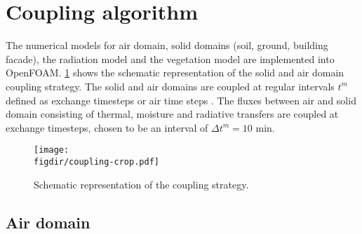 
\section{Coupling algorithm}
\label{sec:couplingalgorithm}

The numerical models for air domain, solid domains (soil, ground, building facade), the radiation model and the vegetation model are implemented into OpenFOAM. \cref{fig:coupling} shows the schematic representation of the solid and air domain coupling strategy. The solid and air domains are coupled at regular intervals $t^m$ defined as exchange timesteps or air time steps \citep{Saneinejad2014,Kubilay2018}. The fluxes between air and solid domain consisting of thermal, moisture and radiative transfers are coupled at exchange timesteps, chosen to be an interval of $\Delta t^m = 10$ min.

\begin{figure}[t]
	\centering
	\texttt{[image: \\figdir/coupling-crop.pdf]}
	\caption{Schematic representation of the coupling strategy.}
	\label{fig:coupling}
\end{figure}


\subsection{Air domain}

